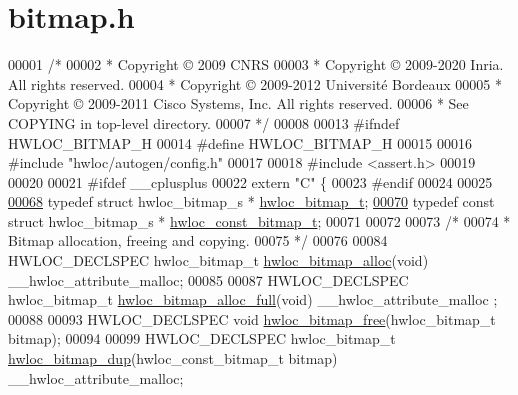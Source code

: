 \hypertarget{a00125_source}{}\section{bitmap.\+h}
\label{a00125_source}

\begin{DoxyCode}
00001 \textcolor{comment}{/*}
00002 \textcolor{comment}{ * Copyright © 2009 CNRS}
00003 \textcolor{comment}{ * Copyright © 2009-2020 Inria.  All rights reserved.}
00004 \textcolor{comment}{ * Copyright © 2009-2012 Université Bordeaux}
00005 \textcolor{comment}{ * Copyright © 2009-2011 Cisco Systems, Inc.  All rights reserved.}
00006 \textcolor{comment}{ * See COPYING in top-level directory.}
00007 \textcolor{comment}{ */}
00008 
00013 \textcolor{preprocessor}{#ifndef HWLOC\_BITMAP\_H}
00014 \textcolor{preprocessor}{#define HWLOC\_BITMAP\_H}
00015 
00016 \textcolor{preprocessor}{#include "hwloc/autogen/config.h"}
00017 
00018 \textcolor{preprocessor}{#include <assert.h>}
00019 
00020 
00021 \textcolor{preprocessor}{#ifdef \_\_cplusplus}
00022 \textcolor{keyword}{extern} \textcolor{stringliteral}{"C"} \{
00023 \textcolor{preprocessor}{#endif}
00024 
00025 
\hyperlink{a00205_gaa3c2bf4c776d603dcebbb61b0c923d84}{00068} \textcolor{keyword}{typedef} \textcolor{keyword}{struct }hwloc\_bitmap\_s * \hyperlink{a00205_gaa3c2bf4c776d603dcebbb61b0c923d84}{hwloc\_bitmap\_t};
\hyperlink{a00205_gae991a108af01d408be2776c5b2c467b2}{00070} \textcolor{keyword}{typedef} \textcolor{keyword}{const} \textcolor{keyword}{struct }hwloc\_bitmap\_s * \hyperlink{a00205_gae991a108af01d408be2776c5b2c467b2}{hwloc\_const\_bitmap\_t};
00071 
00072 
00073 \textcolor{comment}{/*}
00074 \textcolor{comment}{ * Bitmap allocation, freeing and copying.}
00075 \textcolor{comment}{ */}
00076 
00084 HWLOC\_DECLSPEC hwloc\_bitmap\_t \hyperlink{a00205_gadece3d1eb5199fc2fb99bc7dcf1ccc05}{hwloc\_bitmap\_alloc}(\textcolor{keywordtype}{void}) \_\_hwloc\_attribute\_malloc;
00085 
00087 HWLOC\_DECLSPEC hwloc\_bitmap\_t \hyperlink{a00205_ga02853b4a224970587b9d7a0e20d857c0}{hwloc\_bitmap\_alloc\_full}(\textcolor{keywordtype}{void}) \_\_hwloc\_attribute\_malloc
      ;
00088 
00093 HWLOC\_DECLSPEC \textcolor{keywordtype}{void} \hyperlink{a00205_ga156130d85b3a0674d6e0e6770fe68fbe}{hwloc\_bitmap\_free}(hwloc\_bitmap\_t bitmap);
00094 
00099 HWLOC\_DECLSPEC hwloc\_bitmap\_t \hyperlink{a00205_gae679434c1a5f41d3560a8a7e2c1b0dee}{hwloc\_bitmap\_dup}(hwloc\_const\_bitmap\_t bitmap) 
      \_\_hwloc\_attribute\_malloc;

\end{DoxyCode}
